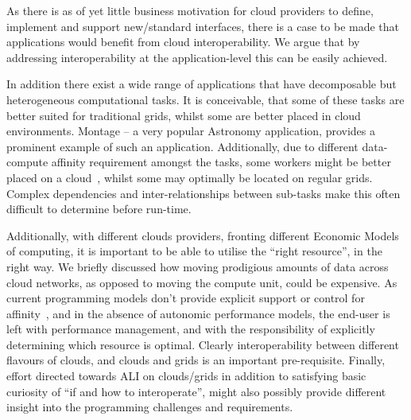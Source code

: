 \documentclass[3p,twocolumn]{elsarticle}
\begin{document}
As there is as of yet little business motivation for cloud providers to
define, implement and support new/standard interfaces, there is a case
to be made that applications would benefit from cloud interoperability.
We argue that by addressing interoperability at the application-level
this can be easily achieved.    

In addition there exist a wide range of applications that have
decomposable but heterogeneous computational tasks. It is conceivable,
that some of these tasks are better suited for traditional grids, whilst
some are better placed in cloud environments. Montage -- a very popular
Astronomy application, provides a prominent example of such an
application.  Additionally, due to different data-compute affinity
requirement amongst the tasks, some workers might be better placed on
a cloud~\cite{jha_ccpe09}, whilst some may optimally be located on
regular grids.  Complex dependencies and
inter-relationships between sub-tasks make this often difficult to
determine before run-time.

Additionally, with different clouds providers, fronting different
Economic Models of computing, it is important to be able to utilise the
``right resource'', in the right way. We briefly discussed how moving
prodigious amounts of data across cloud networks, as opposed to moving
the compute unit, could be expensive.  As current programming models
don't provide explicit support or control for
affinity~\cite{jha_ccpe09}, and in the absence of autonomic performance
models, the end-user is left with performance management, and with the
responsibility of explicitly determining which resource is optimal.
Clearly interoperability between different flavours of clouds, and
clouds and grids is an important pre-requisite.  Finally, effort
directed towards ALI on clouds/grids in addition to satisfying basic
curiosity of ``if and how to interoperate'', might also possibly provide
different insight into the programming challenges and requirements.

\end{document}
